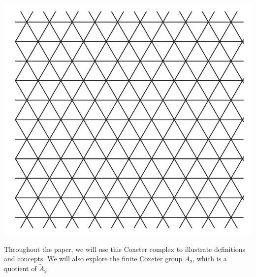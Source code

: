 \documentclass[11pt]{article}
\begin{document}
\begin{center}
    \includegraphics[scale=0.4]{Screenshot 2023-03-28 114008.png}\\
\end{center}

Throughout the paper, we will use this Coxeter complex to illustrate definitions and concepts. We will also explore the finite Coxeter group $A_2$, which is a quotient of $\tilde{A}_2$. 



\end{document}

